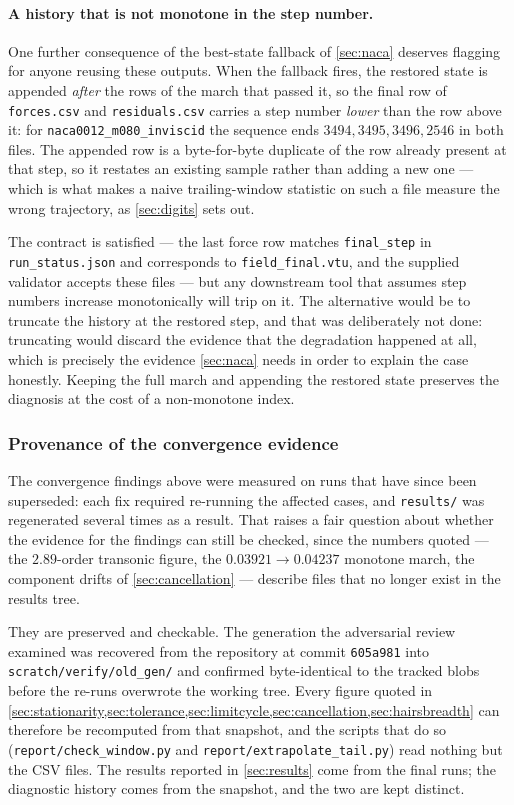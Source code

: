 \paragraph{A history that is not monotone in the step number.} One further consequence of
\label{sec:histwrinkle}
the best-state fallback of \cref{sec:naca} deserves flagging for anyone reusing these
outputs. When the fallback fires, the restored state is appended \emph{after} the rows of
the march that passed it, so the final row of \texttt{forces.csv} and
\texttt{residuals.csv} carries a step number \emph{lower} than the row above it: for
\texttt{naca0012\_m080\_inviscid} the sequence ends $3494, 3495, 3496, 2546$ in both files.
The appended row is a byte-for-byte duplicate of the row already present at that step, so it
restates an existing sample rather than adding a new one --- which is what makes a naive
trailing-window statistic on such a file measure the wrong trajectory, as
\cref{sec:digits} sets out.

The contract is satisfied --- the last force row matches \texttt{final\_step} in
\texttt{run\_status.json} and corresponds to \texttt{field\_final.vtu}, and the supplied
validator accepts these files --- but any downstream tool that assumes step numbers
increase monotonically will trip on it. The alternative would be to truncate the history
at the restored step, and that was deliberately not done: truncating would discard the
evidence that the degradation happened at all, which is precisely the evidence
\cref{sec:naca} needs in order to explain the case honestly. Keeping the full march and
appending the restored state preserves the diagnosis at the cost of a non-monotone index.

\subsubsection{Provenance of the convergence evidence}
\label{sec:provenance}

The convergence findings above were measured on runs that have since been superseded:
each fix required re-running the affected cases, and \texttt{results/} was regenerated
several times as a result. That raises a fair question about whether the evidence for the
findings can still be checked, since the numbers quoted --- the $2.89$-order transonic
figure, the $\num{0.03921}\to\num{0.04237}$ monotone march, the component drifts of
\cref{sec:cancellation} --- describe files that no longer exist in the results tree.

They are preserved and checkable. The generation the adversarial review examined was
recovered from the repository at commit \texttt{605a981} into
\texttt{scratch/verify/old\_gen/} and confirmed byte-identical to the tracked blobs
before the re-runs overwrote the working tree. Every figure quoted in
\cref{sec:stationarity,sec:tolerance,sec:limitcycle,sec:cancellation,sec:hairsbreadth}
can therefore be recomputed from that snapshot, and the scripts that do so
(\texttt{report/check\_window.py} and \texttt{report/extrapolate\_tail.py}) read nothing
but the CSV files. The results reported in \cref{sec:results} come from the final runs;
the diagnostic history comes from the snapshot, and the two are kept distinct.

